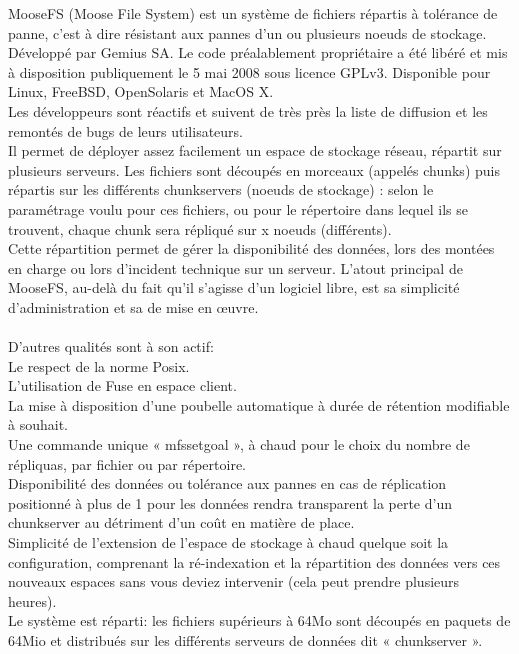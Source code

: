 \documentclass[12pt]{report}
\begin{document}
MooseFS (Moose File System) est un système de fichiers répartis à tolérance de panne, c’est à dire résistant aux pannes d’un ou plusieurs noeuds de stockage. Développé par Gemius SA. Le code préalablement propriétaire a été libéré et mis à disposition publiquement le 5 mai 2008 sous licence GPLv3. Disponible pour Linux, FreeBSD, OpenSolaris et MacOS X.\\
Les développeurs sont réactifs et suivent de très près la liste de diffusion et les remontés de bugs de leurs utilisateurs.\\
Il permet de déployer assez facilement un espace de stockage réseau, répartit sur plusieurs serveurs. 
Les fichiers sont découpés en morceaux (appelés chunks) puis répartis sur les différents chunkservers (noeuds de stockage) : selon le paramétrage voulu pour ces fichiers, ou pour le répertoire dans lequel ils se trouvent, chaque chunk sera répliqué sur x noeuds (différents).\\
Cette répartition permet de gérer la disponibilité des données, lors des montées en charge ou lors d’incident technique sur un serveur. L'atout principal de MooseFS, au-delà du fait qu'il s’agisse d’un logiciel libre, est sa simplicité d'administration et sa de mise en œuvre.\\\\
D'autres qualités sont à son actif: \\
Le respect de la norme Posix.\\
L'utilisation de Fuse en espace client.\\
La mise à disposition d'une poubelle automatique à durée de rétention modifiable à souhait.\\
Une commande unique « mfssetgoal », à chaud pour le choix du nombre de répliquas, par fichier ou par répertoire.\\
Disponibilité des données ou tolérance aux pannes en cas de réplication positionné à plus de 1 pour les données rendra transparent la perte d'un chunkserver au détriment d'un coût en matière de place.\\ 
Simplicité de l'extension de l'espace de stockage à chaud quelque soit la configuration, comprenant la ré-indexation et la répartition des données vers ces nouveaux espaces sans vous deviez intervenir (cela peut prendre plusieurs heures).  \\
Le système est réparti: les fichiers supérieurs à 64Mo sont découpés en paquets de 64Mio et distribués sur les différents serveurs de données dit « chunkserver ».\\
\end{document}
